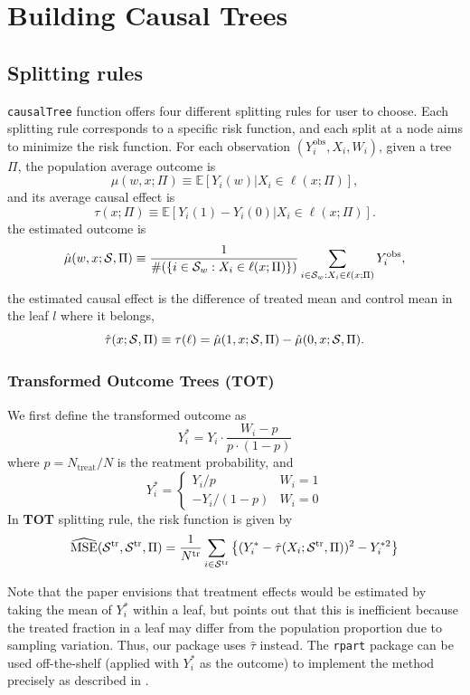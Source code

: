 \documentclass[11pt]{article}
\newcommand{\calp}{{\Pi}}
\newcommand{\cals}{{\cal S}}
\newcommand{\mse}{{\rm MSE}}
\newcommand{\train}{{\rm tr}}
\newcommand{\obs}{{\rm obs}}
\newcommand{\mme}{\mathbb{E}}
\begin{document}
\section{Building Causal Trees}
\subsection{Splitting rules}
\texttt{causalTree} function offers four different splitting rules for user to choose. Each splitting rule corresponds to a specific risk function, and each split at a node aims to minimize the risk function. For each observation $(Y_i^{\text{obs}}, X_i, W_i)$, given a tree $\calp$, the population average outcome is 
\[\mu(w,x;\calp) \equiv \mme\left[\left. Y_i(w) \right| X_i\in\ell(x;\calp) \right], \]
and its average causal effect is 
\[\tau(x;\Pi) \equiv \mme\left[\left. Y_i(1)-Y_i(0) \right| X_i\in\ell(x;\calp) \right]. \]
the estimated outcome is
\[ \hat\mu(w,x;\cals,\calp) \equiv
\frac{1}{\#(\{i\in\cals_w:X_i\in\ell(x;\calp)\})}\sum_{i\in\cals_w:X_i\in\ell(x;\calp)} Y_i^\obs,\]
the estimated causal effect is the difference of treated mean and control mean in the leaf $l$ where it belongs,
\[ \hat\tau(x;\cals,\calp) \equiv \tau(\ell) =  \hat\mu(1,x;\cals,\calp)- \hat\mu(0,x;\cals,\calp).\]

\subsubsection{Transformed Outcome Trees (\textbf{TOT})}
We first define the transformed outcome as 
\[ Y_i^* = Y_i \cdot \frac{W_i - p}{p\cdot(1 - p)}\]
where $p = N_{\text{treat}} / N$ is the reatment probability, and
\[ Y^*_i = \begin{cases} 
     Y_i/p & W_i = 1 \\
      -Y_i/(1 - p) & W_i = 0
   \end{cases}
\]
In \textbf{TOT} splitting rule, the risk function is given by
\[\widehat{\mse}(\cals^\train, \cals^\train, \Pi) = \frac{1}{N^\train}\sum_{i\in\cals^\train}\left\{(Y^*_i - \hat{\tau}(X_i; \cals^\train, \calp))^2  - Y^{*2}_i\right\}\]

Note that the paper \cite{athey2015machine} envisions that treatment effects would be estimated by taking the mean of 
$Y_i^*$ within a leaf, but points out that this is inefficient because the treated fraction in a leaf may differ from the population
proportion due to sampling variation.  Thus, our package uses $\hat\tau$ instead.  The \texttt{rpart} package can be
used off-the-shelf (applied with $Y^*_i$ as the outcome) to implement the method precisely as described in \cite{athey2015machine}.
\end{document}
